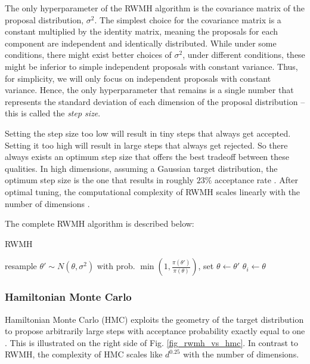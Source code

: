 \documentclass[12pt]{article}
\begin{document}
The only hyperparameter of the RWMH algorithm is the covariance matrix of the proposal distribution, $\sigma^2$. The simplest choice for the covariance matrix is a constant multiplied by the identity matrix, meaning the proposals for each component are independent and identically distributed. While under some conditions, there might exist better choices of $\sigma^2$, under different conditions, these might be inferior to simple independent proposals with constant variance. Thus, for simplicity, we will only focus on independent proposals with constant variance. Hence, the only hyperparameter that remains is a single number that represents the standard deviation of each dimension of the proposal distribution -- this is called the \textit{step size}.

Setting the step size too low will result in tiny steps that always get accepted. Setting it too high will result in large steps that always get rejected. So there always exists an optimum step size that offers the best tradeoff between these qualities. In high dimensions, assuming a Gaussian target distribution, the optimum step size is the one that results in roughly $23\%$ acceptance rate \cite{rwmh_accept_rate}. After optimal tuning, the computational complexity of RWMH scales linearly with the number of dimensions \cite{hmc_rwmh_scaling}.

The complete RWMH algorithm is described below:
\begin{algorithm}
\caption{RWMH}
\label{alg_rwmh}
\begin{algorithmic}
 
	\State resample $\theta' \sim N(\theta, \sigma^2)$ 
	\State with prob. $\min{(1, \frac{\pi(\theta')}{\pi(\theta)})}$, set $\theta \gets \theta'$ 
	\State $\theta_i \gets \theta$ 
\EndFor
\end{algorithmic}
\end{algorithm}

\subsubsection{Hamiltonian Monte Carlo}

Hamiltonian Monte Carlo (HMC) exploits the geometry of the target distribution to propose arbitrarily large steps with acceptance probability exactly equal to one \cite{hmc}. This is illustrated on the right side of Fig. \ref{fig_rwmh_vs_hmc}. In contrast to RWMH, the complexity of HMC scales like $d^{0.25}$ with the number of dimensions.
\end{document}
